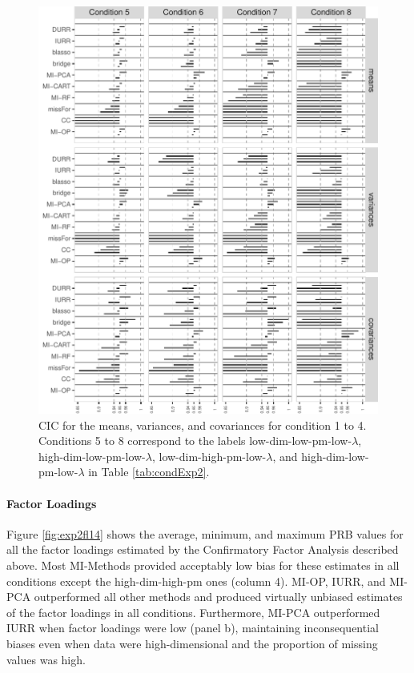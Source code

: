\begin{figure}
	\includegraphics{../../output/graphs/exp2_semR_ci_58_summy.pdf}
\caption{CIC for the means, variances, and covariances for condition 1 to 4.
	Conditions 5 to 8 correspond to the labels low-dim-low-pm-low-$\lambda$, high-dim-low-pm-low-$\lambda$, 
	low-dim-high-pm-low-$\lambda$, and high-dim-low-pm-low-$\lambda$ in Table \ref{tab:condExp2}.
}
\label{fig:exp2cir58}
\end{figure}

\FloatBarrier

	\paragraph{Factor Loadings}
	Figure \ref{fig:exp2fl14} shows the average, minimum, and maximum PRB values for all the factor loadings 
	estimated by the Confirmatory Factor Analysis described above. 
	Most MI-Methods provided acceptably low bias for these estimates in all conditions except the high-dim-high-pm 
	ones (column 4).
	MI-OP, IURR, and MI-PCA outperformed all other methods and produced virtually unbiased estimates
	of the factor loadings in all conditions.
	Furthermore, MI-PCA outperformed IURR when factor loadings were low (panel b), maintaining inconsequential 
	biases even when data were high-dimensional and the proportion of missing values was high.

